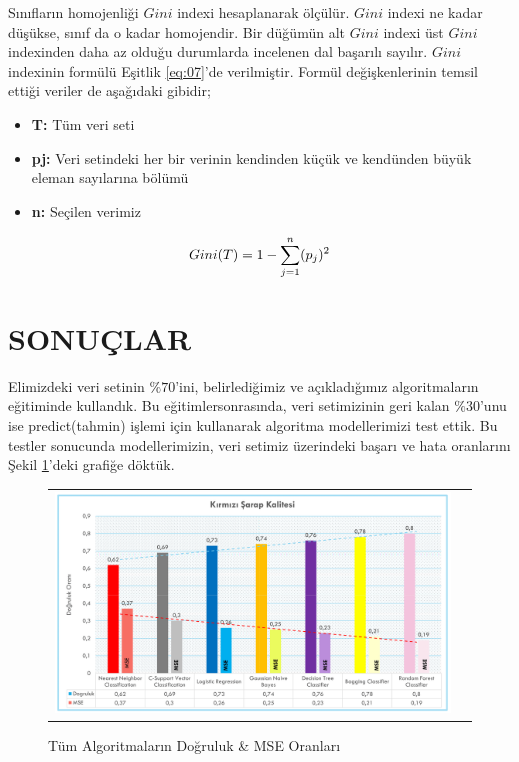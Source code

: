 \documentclass[conference]{IEEEtran}
\begin{document}
\quad Sınıfların homojenliği $Gini$ indexi hesaplanarak ölçülür. $Gini$ indexi ne kadar düşükse, sınıf da o kadar homojendir. Bir düğümün alt $Gini$ indexi üst $Gini$ indexinden daha az olduğu durumlarda incelenen dal başarılı sayılır\cite{21}. $Gini$ indexinin formülü Eşitlik \ref{eq:07}'de verilmiştir. Formül değişkenlerinin temsil ettiği veriler de aşağıdaki gibidir;

\begin{itemize}
\item \textbf{T:} Tüm veri seti
\item \textbf{pj:} Veri setindeki her bir verinin kendinden küçük ve kendünden büyük eleman sayılarına bölümü
\item \textbf{n:} Seçilen verimiz
\end{itemize}

\begin{equation}
\label{eq:07}
\Large Gini(T)=1-\sum_{j=1}^{n}(p_{j})^{2}
\end{equation}

\pagebreak
\section{\textbf{SONUÇLAR}}

\quad Elimizdeki veri setinin $\%70$'ini, belirlediğimiz ve açıkladığımız algoritmaların eğitiminde kullandık. Bu eğitimlersonrasında, veri setimizinin geri kalan $\%30$'unu ise predict(tahmin) işlemi için kullanarak algoritma modellerimizi test ettik. Bu testler sonucunda modellerimizin, veri setimiz üzerindeki başarı ve hata oranlarını Şekil \ref{fig:08}'deki grafiğe döktük.

\begin{figure}[!h]
	\centering
	\begin{center}
		\begin{tabular}{cc}
			\includegraphics[scale=0.15]{pictures/pic_08.png}&
		\end{tabular}
	\end{center}
	\caption{Tüm Algoritmaların Doğruluk \& MSE Oranları}
	\label{fig:08}
\end{figure}
\end{document}
